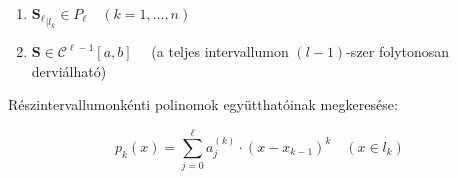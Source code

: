\documentclass[tikz,12pt,margin=0px]{article}
\begin{document}
	\begin{enumerate}
        \item ${\mathbf{S}_{\ell}}_{\big|l_k} \in P_{\ell} \quad (k = 1, \ldots, n)$
		\item $\mathbf{S} \in \mathcal{C}^{\ell-1}[a,b] \quad $ (a teljes intervallumon $(l-1)$-szer folytonosan derviálható)
	\end{enumerate}

    \noindent Részintervallumonkénti polinomok együtthatóinak megkeresése:

    \[
        p_{k}(x) = \sum\limits_{j=0}^{\ell}a^{(k)}_{j} \cdot (x - x_{k-1})^{k} \quad (x \in l_{k})
    \]
\end{document}
